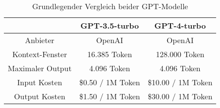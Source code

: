 \bgroup
\def\arraystretch{2}
\begin{table}[h]
	\vspace{.5cm}
	\begin{center}
		\begin{tabular}{|c||c|c|}
			\hline 
			& GPT-3.5-turbo & GPT-4-turbo \\
			\hline 
			\hline
			Anbieter & OpenAI & OpenAI \\
			\hline
			Kontext-Fenster & 16.385 Token & 128.000 Token \\
			\hline
			Maximaler Output & 4.096 Token & 4.096 Token \\
			\hline
			Input Kosten & \$0.50 / 1M Token & \$10.00 / 1M Token \\
			\hline
			Output Kosten & \$1.50 / 1M Token & \$30.00 / 1M Token \\
			\hline
		\end{tabular} 
	\end{center}
	\caption{Grundlegender Vergleich beider GPT-Modelle}
	\label{fig:gpt}
\end{table}
\egroup